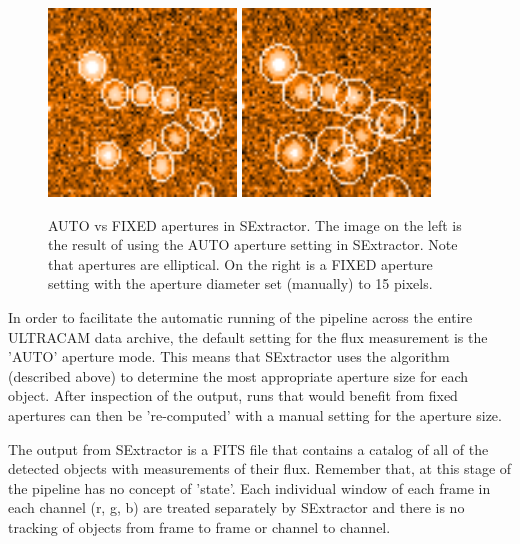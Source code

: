 \begin{enumerate}
\begin{figure}
  \centering
  \includegraphics[width=50mm]{images/sex_apertures_auto_cropped.png}
  \includegraphics[width=50mm]{images/sex_apertures_fixed_cropped.png}
  \caption{AUTO vs FIXED apertures in SExtractor. The image on the left is the result of using the AUTO aperture setting in SExtractor. Note that apertures are elliptical. On the right is a FIXED aperture setting with the aperture diameter set (manually) to 15 pixels.}
\label{fig:fixedautoapertures}
\end{figure}

 
\end{enumerate}

In order to facilitate the automatic running of the pipeline across the entire ULTRACAM data archive, the default setting for the flux measurement is the 'AUTO' aperture mode. This means that SExtractor uses the algorithm (described above) to determine the most appropriate aperture size for each object. After inspection of the output, runs that would benefit from fixed apertures can then be 're-computed' with a manual setting for the aperture size. 

The output from SExtractor is a FITS file that contains a catalog of all of the detected objects with measurements of their flux. Remember that, at this stage of the pipeline has no concept of 'state'. Each individual window of each frame in each channel (r, g, b) are treated separately by SExtractor and there is no tracking of objects from frame to frame or channel to channel. 

